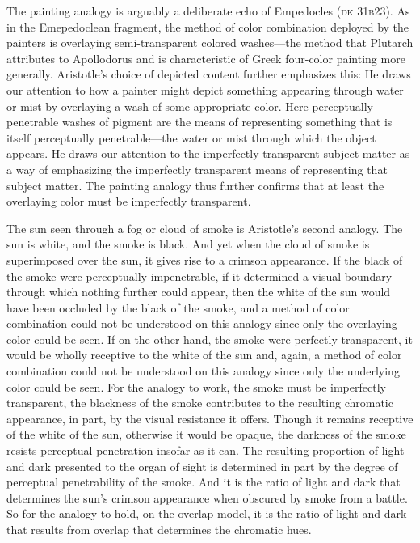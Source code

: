 The painting analogy is arguably a deliberate echo of Empedocles (\textsc{dk} 31\textsc{b}23). As in the Emepedoclean fragment, the method of color combination deployed by the painters is overlaying semi-transparent colored washes---the method that Plutarch attributes to Apollodorus and is characteristic of Greek four-color painting more generally. Aristotle's choice of depicted content further emphasizes this: He draws our attention to how a painter might depict something appearing through water or mist by overlaying a wash of some appropriate color. Here perceptually penetrable washes of pigment are the means of representing something that is itself perceptually penetrable---the water or mist through which the object appears. He draws our attention to the imperfectly transparent subject matter as a way of emphasizing the imperfectly transparent means of representing that subject matter. The painting analogy thus further confirms that at least the overlaying color must be imperfectly transparent.

The sun seen through a fog or cloud of smoke is Aristotle's second analogy. The sun is white, and the smoke is black. And yet when the cloud of smoke is superimposed over the sun, it gives rise to a crimson appearance. If the black of the smoke were perceptually impenetrable, if it determined a visual boundary through which nothing further could appear, then the white of the sun would have been occluded by the black of the smoke, and a method of color combination could not be understood on this analogy since only the overlaying color could be seen. If on the other hand, the smoke were perfectly transparent, it would be wholly receptive to the white of the sun and, again, a method of color combination could not be understood on this analogy since only the underlying color could be seen. For the analogy to work, the smoke must be imperfectly transparent, the blackness of the smoke contributes to the resulting chromatic appearance, in part, by the visual resistance it offers. Though it remains receptive of the white of the sun, otherwise it would be opaque, the darkness of the smoke resists perceptual penetration insofar as it can. The resulting proportion of light and dark presented to the organ of sight is determined in part by the degree of perceptual penetrability of the smoke. And it is the ratio of light and dark that determines the sun's crimson appearance when obscured by smoke from a battle. So for the analogy to hold, on the overlap model, it is the ratio of light and dark that results from overlap that determines the chromatic hues.

